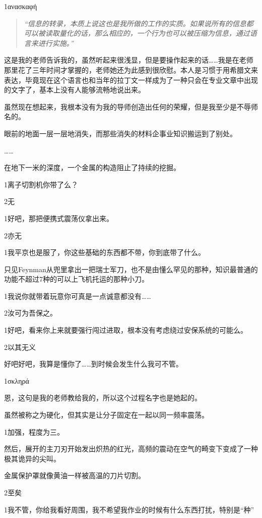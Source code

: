 \documentclass{article}
\begin{document}
1ανασκαφή
\begin{quote}
\textit{“信息的转录，本质上说这也是我所做的工作的实质。如果说所有的信息都可以被读取量化的话，那么相应的，一个行为也可以被压缩为信息，通过语言来进行实施。”}

		
\end{quote}	

这是我的老师告诉我的，虽然听起来很浅显，但是要操作起来的话……我是在老师那里花了三年时间才掌握的，老师她还为此感到很欣慰。本人是习惯于用希腊文来表达，毕竟现在这个语言也和当年的拉丁文一样成为了一种只会在专业文章中出现的文字了，基本上没有人能够流畅地说出来。

虽然现在想起来，我根本没有为我的导师创造出任何的荣耀，但是我至少是不辱师名的。

眼前的地面一层一层地消失，而那些消失的材料企事业知识搬运到了别处。

……

在地下一米的深度，一个金属的构造阻止了持续的挖掘。

1离子切割机你带了么？

2无

1好吧，那把便携式震荡仪拿出来。

2亦无

1我平京也是服了，你这些基础的东西都不带，你到底带了什么。

只见Feynman从兜里拿出一把瑞士军刀，也不是由懂么罕见的那种，知识最普通的功能不超过7种的可以上飞机托运的那种小刀。

1我说你就带着玩意你可真是一点诚意都没有……

2汝可为吾保之。

1好吧，看来你上来就要强行闯过进取，根本没有考虑绕过安保系统的可能么。

2以其无义

好吧好吧，我算是懂你了……到时候会发生什么我可不管。

1σκληρά

恩，这句是我的老师教给我的，所以这个过程名字也是她起的。

虽然被称之为硬化，但其实是让分子固定在一起以同一频率震荡。

1加强，程度为三。

然后，展开的主刀刃开始发出炽热的红光，高频的震动在空气的畸变下变成了一种极其诡异的尖叫。

金属保护罩就像黄油一样被高温的刀片切割。

2至矣

1我不管，你给我看好周围，我不希望我作业的时候有什么东西打扰，特别是“种”
\end{document}
